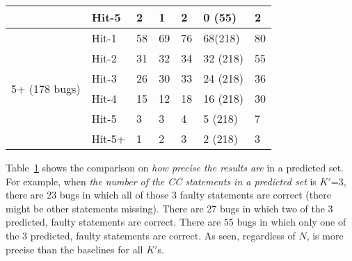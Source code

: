 \begin{table}[t]
{\begin{center}
\begin{tabular}{p{1.5cm}<{\centering}|p{0.8cm}<{\centering}|p{1cm}<{\centering}|p{0.8cm}<{\centering}|p{1.2cm}<{\centering}|p{0.9cm}<{\centering}|p{1.1cm}<{\centering}}
				& Hit-5      						   & 2 & 1 & 2 & 0 (55) &2 \\
				\hline
				\multirow{6}{*}{5+ (178 bugs)}  & Hit-1 & 58 & 69 & 76 & 68(218)& 80 \\
				& Hit-2        				       & 31 & 32 & 34 & 32 (218) &55 \\
				& Hit-3       				       & 26 & 30 & 33 & 24 (218) &36 \\
				& Hit-4      				       & 15 & 12 & 18 & 16 (218)&30 \\
				& Hit-5      				       & 3  & 3 & 4 & 5 (218) &7 \\
				& Hit-5+       				       & 1  & 2 & 3 & 2 (218) & 3 \\
				\hline
			\end{tabular}
			\label{fig:rq1-prec}
		\end{center}
	}
\end{table}

Table~\ref{fig:rq1-prec} shows the comparison on {\em how precise the
results are} in a predicted set. For example, when {\em the number of the
CC statements in a predicted set} is $K'$=3, there are 23 bugs in which
all of those 3 faulty statements are correct (there might be other
statements missing).  There are 27 bugs in which two of the 3
predicted, faulty statements are correct. There are 55 bugs in which
only one of the 3 predicted, faulty statements are correct. As seen,
regardless of $N$, {\tool} is more precise than the baselines for all
$K'$s.









